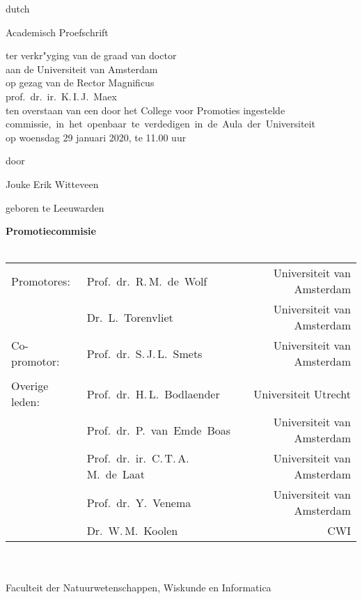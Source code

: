 {%
\clearpage
\par\vskip 2cm
\begin{center}
\begin{otherlanguage*}{dutch}
\printtitle
\par\vspace {6cm}
{\large \sc Academisch Proefschrift}
\par\vspace {1cm}
{\large ter verkr"yging van de graad van doctor\\
aan de Universiteit van Amsterdam\\
op gezag van de Rector Magnificus\\
prof.~dr.~ir.~K.\,I.\,J.~Maex\\
ten overstaan van een door het College voor Promoties ingestelde\\
\mbox{commissie, in het openbaar te verdedigen in de Aula der Universiteit}\\
op woensdag 29 januari 2020, te 11.00 uur \\ }
\par\vspace {1cm} {\large door}
\par \vspace {1cm}
{\Large Jouke Erik Witteveen} %
\par\vspace {1cm}
{\large geboren te Leeuwarden}
\end{otherlanguage*}
\end{center}

\clearpage
\noindent%
{\bf Promotiecommisie}\\
\\
\begin{tabular}[t]{@{}llr}
Promotores:    & Prof.~dr.~R.\,M.~de~Wolf     & Universiteit van Amsterdam \\
               & Dr.~L.~Torenvliet            & Universiteit van Amsterdam \\
Co-promotor:   & Prof.~dr.~S.\,J.\,L.~Smets   & Universiteit van Amsterdam \\
\\
Overige leden: & Prof.~dr.~H.\,L.~Bodlaender  & Universiteit Utrecht \\
               & Prof.~dr.~P.~van~Emde~Boas   & Universiteit van Amsterdam \\
               & Prof.~dr.~ir.~C.\,T.\,A.\,M.~de~Laat & Universiteit van Amsterdam \\
               & Prof.~dr.~Y.~Venema          & Universiteit van Amsterdam \\
               & Dr.~W.\,M.~Koolen            & CWI \\
\end{tabular}\\
\\
Faculteit der Natuurwetenschappen, Wiskunde en Informatica \\
\clearpage
} %


